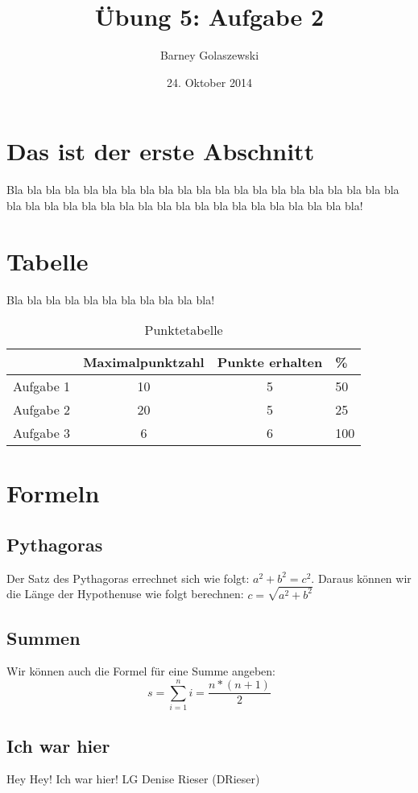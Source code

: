 \documentclass[11pt,a4paper]{article}
\title{Übung 5: Aufgabe 2}
\date{24. Oktober 2014}
\author{Barney Golaszewski}
\begin{document}
\maketitle


\section{Das ist der erste Abschnitt}
Bla bla bla bla bla bla bla bla bla bla bla bla bla bla bla bla bla bla bla bla bla bla bla bla bla bla bla bla bla bla bla bla bla bla bla bla bla bla bla bla! \cite{der1955einfuhrung}

\section{Tabelle}
Bla bla bla bla bla bla bla bla bla bla bla!

\begin{table}[h]
\centering
\begin{tabular}{r|c|c|l}
 & Maximalpunktzahl & Punkte erhalten & \% \\
\hline
Aufgabe 1 & 10 & 5 & 50 \\
Aufgabe 2 & 20 & 5 & 25 \\
Aufgabe 3 & 6 & 6 & 100 \\
\end{tabular}
\caption{Punktetabelle \cite{hilbert1928grundlagen}}
\end{table}

\section{Formeln}

\subsection{Pythagoras}
Der Satz des Pythagoras errechnet sich wie folgt: $a^2+b^2=c^2$. Daraus können wir die Länge der Hypothenuse wie folgt berechnen: $c=\sqrt{a^2+b^2}$ \cite{varma2013effect}

\subsection{Summen}
Wir können auch die Formel für eine Summe angeben:
\begin{equation}
s=\sum\limits_{i=1}^ni=\frac{n*(n+1)}{2}
\end{equation}




\subsection{Ich war hier}
Hey Hey!
Ich war hier!
LG Denise Rieser (DRieser)
\end{document}
